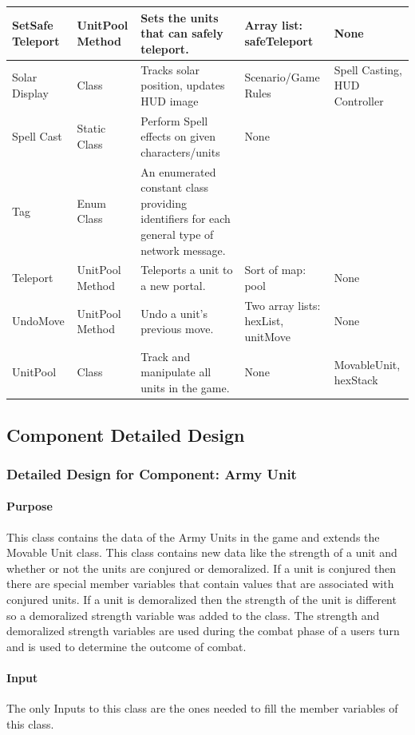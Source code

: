 \documentclass[12pt,a4paper,titlepage]{article}
\begin{document}
{\begin{center}
\begin{tabularx}{\linewidth}{|X|X|p{2in}|X|X|}
\hline
SetSafe Teleport & UnitPool Method & Sets the units that can safely teleport. & Array list: safeTeleport & None\\
\hline
Solar Display & Class & Tracks solar position, updates HUD image & Scenario/Game Rules & Spell Casting, HUD Controller\\
\hline
Spell Cast & Static Class & Perform Spell effects on given characters/units & None\\
\hline
Tag & Enum Class & An enumerated constant class providing identifiers for each general type of network message. & & \\
\hline
Teleport & UnitPool Method & Teleports a unit to a new portal. & Sort of map: pool & None\\
\hline 
UndoMove & UnitPool Method & Undo a unit's previous move. & Two array lists: hexList, unitMove & None\\
\hline
UnitPool & Class & Track and manipulate all units in the game. & None & MovableUnit, hexStack\\
\hline
\end{tabularx}
\end{center}
}

\subsection{Component Detailed Design}
\subsubsection{Detailed Design for Component: Army Unit}
\paragraph{Purpose} This class contains the data of the Army Units in the game and extends the Movable Unit class. This class contains new data like the strength of a unit and whether or not the units are conjured or demoralized. If a unit is conjured then there are special member variables that contain values that are associated with conjured units. If a unit is demoralized then the strength of the unit is different so a demoralized strength variable was added to the class. The strength and demoralized strength variables are used during the combat phase of a users turn and is used to determine the outcome of combat. 
\paragraph{Input} The only Inputs to this class are the ones needed to fill the member variables of this class.
\end{document}
